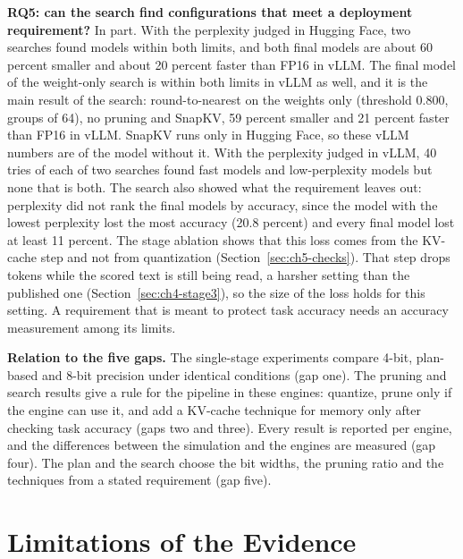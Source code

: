 \documentclass[
11pt, %
english, %
singlespacing, %
headsepline, %
]{MastersDoctoralThesis} %
\begin{document}
\textbf{RQ5: can the search find configurations that meet a deployment requirement?} In part. With the perplexity judged in Hugging Face, two searches found models within both limits, and both final models are about 60 percent smaller and about 20 percent faster than FP16 in vLLM. The final model of the weight-only search is within both limits in vLLM as well, and it is the main result of the search: round-to-nearest on the weights only (threshold 0.800, groups of 64), no pruning and SnapKV, 59 percent smaller and 21 percent faster than FP16 in vLLM. SnapKV runs only in Hugging Face, so these vLLM numbers are of the model without it. With the perplexity judged in vLLM, 40 tries of each of two searches found fast models and low-perplexity models but none that is both. The search also showed what the requirement leaves out: perplexity did not rank the final models by accuracy, since the model with the lowest perplexity lost the most accuracy (20.8 percent) and every final model lost at least 11 percent. The stage ablation shows that this loss comes from the KV-cache step and not from quantization (Section~\ref{sec:ch5-checks}). That step drops tokens while the scored text is still being read, a harsher setting than the published one (Section~\ref{sec:ch4-stage3}), so the size of the loss holds for this setting. A requirement that is meant to protect task accuracy needs an accuracy measurement among its limits.

\textbf{Relation to the five gaps.} The single-stage experiments compare 4-bit, plan-based and 8-bit precision under identical conditions (gap one). The pruning and search results give a rule for the pipeline in these engines: quantize, prune only if the engine can use it, and add a KV-cache technique for memory only after checking task accuracy (gaps two and three). Every result is reported per engine, and the differences between the simulation and the engines are measured (gap four). The plan and the search choose the bit widths, the pruning ratio and the techniques from a stated requirement (gap five).

\section{Limitations of the Evidence}
\label{sec:ch5-limits}
\end{document}
